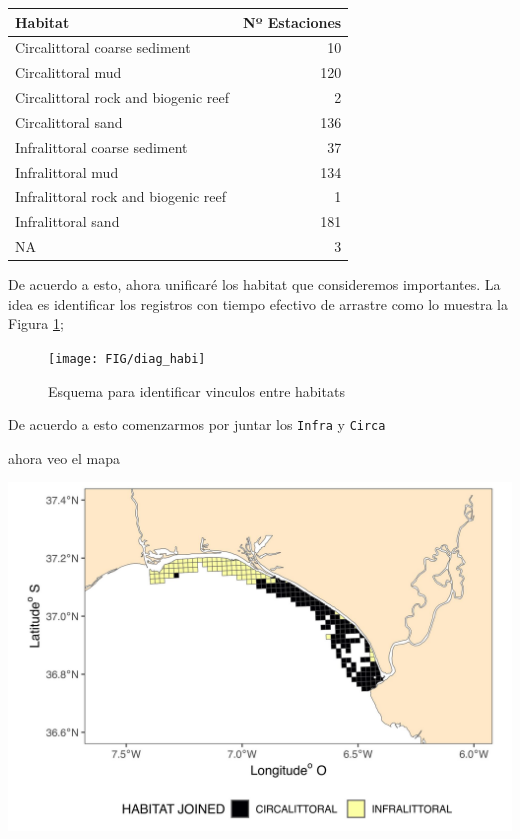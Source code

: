 \documentclass[
]{article}
\begin{document}
\begin{tabular}[t]{l|r}
\hline
Habitat & Nº Estaciones\\
\hline
Circalittoral coarse sediment & 10\\
\hline
Circalittoral mud & 120\\
\hline
Circalittoral rock and biogenic reef & 2\\
\hline
Circalittoral sand & 136\\
\hline
Infralittoral coarse sediment & 37\\
\hline
Infralittoral mud & 134\\
\hline
Infralittoral rock and biogenic reef & 1\\
\hline
Infralittoral sand & 181\\
\hline
NA & 3\\
\hline
\end{tabular}

De acuerdo a esto, ahora unificaré los habitat que consideremos importantes.
La idea es identificar los registros con tiempo efectivo de arrastre como lo muestra la Figura \ref{fig:esq2};

\begin{figure}

{\centering \texttt{[image: FIG/diag\_habi]} 

}

\caption{Esquema para identificar vinculos entre habitats}\label{fig:esq2}
\end{figure}

De acuerdo a esto comenzarmos por juntar los \texttt{Infra} y \texttt{Circa}

ahora veo el mapa

\begin{center}\includegraphics{Habitat_files/figure-latex/unnamed-chunk-7-1} \end{center}
\end{document}
